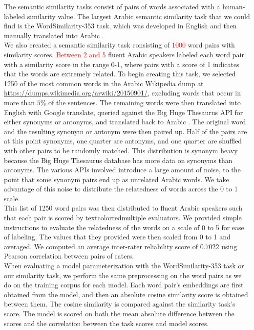 The semantic similarity tasks consist of pairs of words associated with a human-labeled similarity value. The largest Arabic semantic similarity task that we could find is the WordSimilarity-353 task, which was developed in English and then manually translated into Arabic \cite{finkelstein:2001,hassan:2009}. 
\\
We also created a semantic similarity task consisting of \textcolor{red}{1000} word pairs with similarity scores. \textcolor{red}{Between 2 and 5} fluent Arabic speakers labeled each word pair with a similarity score in the range 0-1, where pairs with a score of 1 indicates that the words are extremely related. To begin creating this task, we selected 1250 of the most common words in the Arabic Wikipedia dump \cite{wiki:xxx} at \url{https://dumps.wikimedia.org/arwiki/20150901/}, excluding words that occur in more than $5\%$ of the sentences. The remaining words were then translated into English with Google translate, queried against the Big Huge Thesaurus API for either synonyms or antonyms, and translated back to Arabic \cite{google:online,bhl:online}. The original word and the resulting synonym or antonym were then paired up. Half of the pairs are at this point synonyms, one quarter are antonyms, and one quarter are shuffled with other pairs to be randomly matched. This distribution is synonym heavy because the Big Huge Thesaurus database has more data on synonyms than antonyms. The various APIs involved introduce a large amount of noise, to the point that some synonym pairs end up as unrelated Arabic words. We take advantage of this noise to distribute the relatedness of words across the 0 to 1 scale.
\\
This list of 1250 word pairs was then distributed to fluent Arabic speakers such that each pair is scored by textcolor{red}{multiple evaluators}. We provided simple instructions to evaluate the relatedness of the words on a scale of 0 to 5 for ease of labeling. The values that they provided were then scaled from 0 to 1 and averaged. We computed an average inter-rater reliability score of $0.7022$ using Pearson correlation between pairs of raters.
\\
When evaluating a model parameterization with the WordSimilarity-353 task or our similarity task, we perform the same preprocessing on the word pairs as we do on the training corpus for each model. Each word pair's embeddings are first obtained from the model, and then an absolute cosine similarity score is obtained between them. The cosine similarity is compared against the similarity task's score. The model is scored on both the mean absolute difference between the scores and the correlation between the task scores and model scores.


